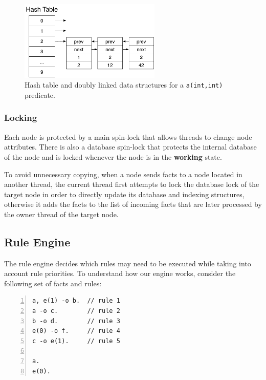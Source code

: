 \begin{figure}[ht]
\centering
\includegraphics[width=0.6\textwidth]{figures/implementation/hash_table.pdf}
\caption{Hash table and doubly linked data structures for 
   a \texttt{a(int,int)} predicate.}
\label{fig:implementation:hash_table}
\end{figure}

\subsubsection{Locking}

Each node is protected by a main spin-lock that allows threads to change node
attributes. There is also a database spin-lock that protects the internal
database of the node and is locked whenever the node is in the \textbf{working}
state.  

To avoid unnecessary copying, when a node sends facts to a node located in
another thread, the current thread first attempts to lock the database lock of
the target node in order to directly update its database and indexing
structures, otherwise it adds the facts to the list of incoming facts that are
later processed by the owner thread of the target node.



\subsection{Rule Engine}
\label{sec:implementation:rule_engine}

The rule engine decides which rules may need to be executed while taking into
account rule priorities. To understand how our engine works, consider the
following set of facts and rules:

\begin{Verbatim}[numbers=left,fontsize=\codesize]
a, e(1) -o b.  // rule 1
a -o c.        // rule 2
b -o d.        // rule 3
e(0) -o f.     // rule 4
c -o e(1).     // rule 5

a.
e(0).
\end{Verbatim}

